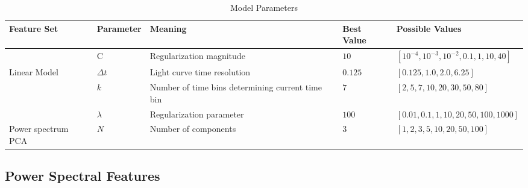 \documentclass[12pt]{emulateapj}
\begin{document}
\begin{table}[hbtp]
\renewcommand{\arraystretch}{1.3}
\footnotesize
\caption{Model Parameters}
\begin{threeparttable} 
\begin{tabularx}{\textwidth}{p{2.0cm}p{2.0cm}p{5.0cm}p{1.0cm}p{6.0cm}}
\toprule
\bf{Feature Set} & \bf{Parameter} & \bf{Meaning} & Best Value &  \bf{Possible Values} \\ \midrule
		& C & Regularization magnitude & $10$ & $[10^{-4}, 10^{-3}, 10^{-2}, 0.1, 1, 10, 40]$ \\ \midrule
 Linear Model & $\Delta t$ & Light curve time resolution & $0.125$ & $[0.125, 1.0, 2.0, 6.25]$ \\
		& $k$ & Number of time bins determining current time bin & $7$ & $[2, 5, 7, 10, 20, 30, 50, 80]$ \\
		& $\lambda$ & Regularization parameter & $100$ & $[0.01, 0.1, 1, 10, 20, 50, 100, 1000]$ \\ \midrule
Power spectrum PCA & $N$ & Number of components & $3$ & $[1,2,3,5,10,20,50,100]$ \\

 \bottomrule
\end{tabularx}
   \begin{tablenotes}
      \item{}
\end{tablenotes}
\end{threeparttable}
\label{table:parameters}
\end{table}


\subsection{Power Spectral Features}
\end{document}
